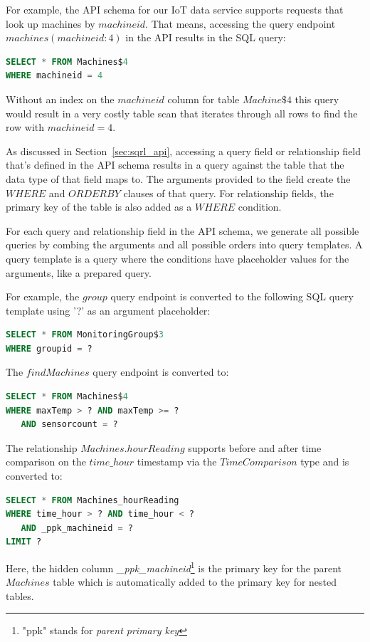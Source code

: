 \documentclass[	DIV=calc,%
							paper=letter,%
							fontsize=11pt,%
							twocolumn]{scrartcl}	 					%
\begin{document}
For example, the API schema for our IoT data service supports requests that look up machines by $machineid$. That means, accessing the query endpoint $machines(machineid: 4)$ in the API results in the SQL query:
\begin{lstlisting}[language=SQL]
SELECT * FROM Machines$4
WHERE machineid = 4
\end{lstlisting}

Without an index on the $machineid$ column for table $Machine\$4$ this query would result in a very costly table scan that iterates through all rows to find the row with $machineid = 4$.

As discussed in Section~\ref{sec:sqrl_api}, accessing a query field or relationship field that's defined in the API schema results in a query against the table that the data type of that field maps to. The arguments provided to the field create the $WHERE$ and $ORDER BY$ clauses of that query. For relationship fields, the primary key of the table is also added as a $WHERE$ condition.

For each query and relationship field in the API schema, we generate all possible queries by combing the arguments and all possible orders into query templates. A query template is a query where the conditions have placeholder values for the arguments, like a prepared query.

For example, the $group$ query endpoint is converted to the following SQL query template using '?' as an argument placeholder:
\begin{lstlisting}[language=SQL]
SELECT * FROM MonitoringGroup$3
WHERE groupid = ?
\end{lstlisting}

The $findMachines$ query endpoint is converted to:
\begin{lstlisting}[language=SQL]
SELECT * FROM Machines$4
WHERE maxTemp > ? AND maxTemp >= ?
   AND sensorcount = ?
\end{lstlisting}

The relationship $Machines.hourReading$ supports before and after time comparison on the $time\_hour$ timestamp via the $TimeComparison$ type and is converted to:
\begin{lstlisting}[language=SQL]
SELECT * FROM Machines_hourReading
WHERE time_hour > ? AND time_hour < ?
   AND _ppk_machineid = ?
LIMIT ?
\end{lstlisting}

Here, the hidden column \emph{\_ppk\_machineid}\footnote{"ppk" stands for \emph{parent primary key}} is the primary key for the parent $Machines$ table which is automatically added to the primary key for nested tables.
\end{document}
